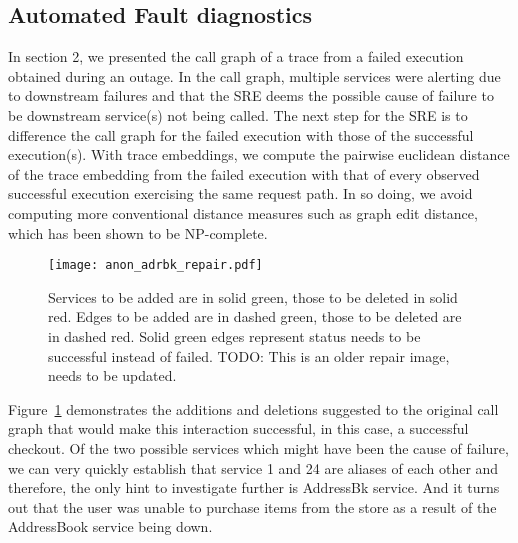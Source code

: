 \subsection{Automated Fault diagnostics}
In section 2, we presented the call graph of a trace from a failed execution obtained during an outage. In the call graph, multiple services were alerting due to downstream failures and that the SRE deems the possible cause of failure to be downstream service(s) not being called. The next step for the SRE is to difference the call graph for the failed execution with those of the successful execution(s). With trace embeddings, we compute the pairwise euclidean distance of the trace embedding from the failed execution with that of every observed successful execution exercising the same request path. In so doing, we avoid computing more conventional distance measures such as graph edit distance, which has been shown to be NP-complete. 

\begin{figure}
\texttt{[image: anon\_adrbk\_repair.pdf]}
\caption{Services to be added are in solid green, those to be deleted in solid red. Edges to be added are in dashed green, those to be deleted are in dashed red. Solid green edges represent status needs to be successful instead of failed. TODO: This is an older repair image, needs to be updated. }
\label{RootCauseHint}
\end{figure}

Figure~\ref{RootCauseHint} demonstrates the additions and deletions suggested to the original call graph that would make this interaction successful, in this case, a successful checkout. Of the two possible services which might have been the cause of failure, we can very quickly establish that service 1 and 24 are aliases of each other and therefore, the only hint to investigate further is AddressBk service. And it turns out that the user was unable to purchase items from the store as a result of the AddressBook service being down. 

 \newline

\newline

